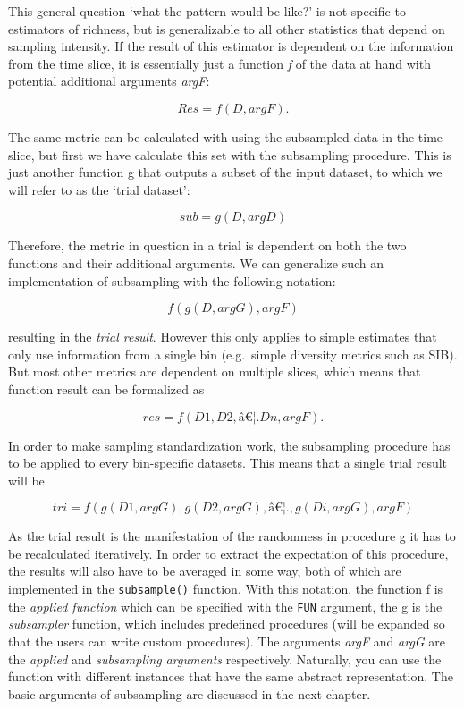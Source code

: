 \documentclass[]{article}
\begin{document}
This general question `what the pattern would be like?' is not specific
to estimators of richness, but is generalizable to all other statistics
that depend on sampling intensity. If the result of this estimator is
dependent on the information from the time slice, it is essentially just
a function \emph{f} of the data at hand with potential additional
arguments \emph{argF}:

\[Res= f(D, argF).\]

The same metric can be calculated with using the subsampled data in the
time slice, but first we have calculate this set with the subsampling
procedure. This is just another function g that outputs a subset of the
input dataset, to which we will refer to as the `trial dataset':

\[sub = g(D, argD)\]

Therefore, the metric in question in a trial is dependent on both the
two functions and their additional arguments. We can generalize such an
implementation of subsampling with the following notation:

\[f(g(D, argG), argF)\]

resulting in the \emph{trial result}. However this only applies to
simple estimates that only use information from a single bin
(e.g.~simple diversity metrics such as SIB). But most other metrics are
dependent on multiple slices, which means that function result can be
formalized as

\[res = f(D1, D2,â€¦. Dn, argF).\]

In order to make sampling standardization work, the subsampling
procedure has to be applied to every bin-specific datasets. This means
that a single trial result will be

\[tri = f(g(D1, argG), g(D2, argG),â€¦., g(Di, argG), argF) \]

As the trial result is the manifestation of the randomness in procedure
g it has to be recalculated iteratively. In order to extract the
expectation of this procedure, the results will also have to be averaged
in some way, both of which are implemented in the \texttt{subsample()}
function. With this notation, the function f is the \emph{applied
function} which can be specified with the \texttt{FUN} argument, the g
is the \emph{subsampler} function, which includes predefined procedures
(will be expanded so that the users can write custom procedures). The
arguments \emph{argF} and \emph{argG} are the \emph{applied} and
\emph{subsampling arguments} respectively. Naturally, you can use the
function with different instances that have the same abstract
representation. The basic arguments of subsampling are discussed in the
next chapter.
\end{document}
